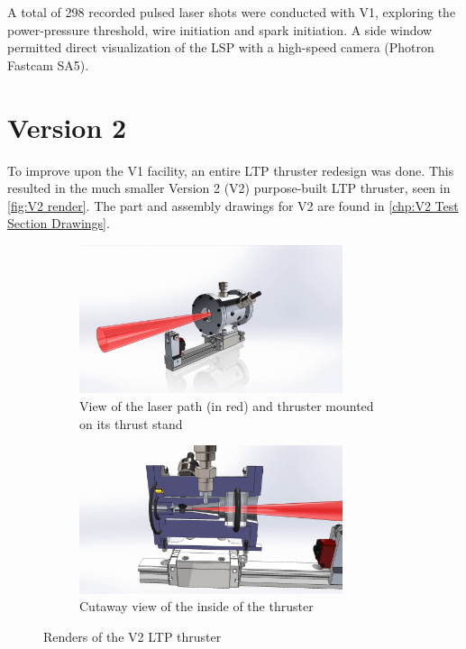         A total of 298 recorded pulsed laser shots were conducted with V1, exploring the power-pressure threshold, wire initiation and spark initiation. A side window permitted direct visualization of the LSP with a high-speed camera (Photron Fastcam SA5).

    \section{Version 2} \label{sec:design_v2}

        To improve upon the V1 facility, an entire LTP thruster redesign was done. This resulted in the much smaller Version 2 (V2) purpose-built LTP thruster, seen in \autoref{fig:V2 render}. The part and assembly drawings for V2 are found in \autoref{chp:V2 Test Section Drawings}.

        \begin{figure}[!ht]
            \centering
            \begin{subfigure}[t]{\textwidth}
                \centering
                \includegraphics[width=0.85\textwidth]{assets/3 design/V2 render 45 view.png}
                \caption{View of the laser path (in red) and thruster mounted on its thrust stand}
            \end{subfigure}
            \hfill
            \begin{subfigure}[t]{\textwidth}
                \centering
                \includegraphics[width=0.85\textwidth]{assets/3 design/V2 render cutout.png}
                \caption{Cutaway view of the inside of the thruster}
            \end{subfigure}
            \caption{Renders of the V2 LTP thruster}
            \label{fig:V2 render}
        \end{figure}

